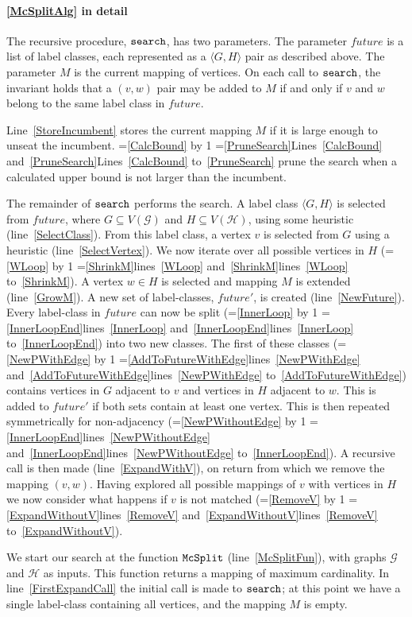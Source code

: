\documentclass[letterpaper]{article}
\newcommand{\AlgVar}[1]{\mathit{#1}}
\newcommand{\graphG}{\mathcal{G}}
\newcommand{\graphH}{\mathcal{H}}
\newcommand{\setG}{G}
\newcommand{\setH}{H}
\newcommand{\lineref}[1]{line~\ref{#1}}
\newcommand{\linerangeref}[2]{\count255=\ref{#1}\advance\count255 by 1 \ifnum\count255=\ref{#2}lines~\ref{#1} and~\ref{#2}\else lines~\ref{#1} to~\ref{#2}\fi}
\newcommand{\Lineref}[1]{Line~\ref{#1}}
\newcommand{\Linerangeref}[2]{\count255=\ref{#1}\advance\count255 by 1 \ifnum\count255=\ref{#2}Lines~\ref{#1} and~\ref{#2}\else Lines~\ref{#1} to~\ref{#2}\fi}
\begin{document}
\paragraph{\cref{McSplitAlg} in detail} The recursive procedure,
$\FuncSty{search}$, has two parameters.  The parameter $\AlgVar{future}$ is a
list of label classes, each represented as a $\langle \setG, \setH \rangle$ pair as
described above.  The parameter $M$ is the current mapping of vertices.  On
each call to $\FuncSty{search}$, the invariant holds that a $(v,w)$ pair may be
added to $M$ if and only if $v$ and $w$ belong to the same label class in
$\AlgVar{future}$.

\Lineref{StoreIncumbent} stores the current mapping $M$ if it is large enough
to unseat the incumbent.  \Linerangeref{CalcBound}{PruneSearch} prune the
search when a calculated upper bound is not larger than the incumbent.

The remainder of $\FuncSty{search}$ performs the search.  A label class
$\langle \setG, \setH \rangle$ is selected from $\AlgVar{future}$, where $\setG \subseteq
V(\graphG)$ and $\setH \subseteq V(\graphH)$, using some heuristic (\lineref{SelectClass}).
From this label class, a vertex $v$ is selected from $\setG$ using a heuristic
(\lineref{SelectVertex}). We now iterate over all possible vertices in $\setH$
(\linerangeref{WLoop}{ShrinkM}). A vertex $w \in \setH$ is selected and mapping $M$
is extended (\lineref{GrowM}). A new set of label-classes, $\AlgVar{future'}$,
is created (\lineref{NewFuture}).  Every label-class in $\AlgVar{future}$ can
now be split (\linerangeref{InnerLoop}{InnerLoopEnd}) into two new classes. The
first of these classes (\linerangeref{NewPWithEdge}{AddToFutureWithEdge})
contains vertices in $\setG$ adjacent to $v$ and vertices in $\setH$ adjacent to $w$.
This is added to $\AlgVar{future'}$ if both sets contain at least one vertex.
This is then repeated symmetrically for non-adjacency
(\linerangeref{NewPWithoutEdge}{InnerLoopEnd}). A recursive call is then made
(\lineref{ExpandWithV}), on return from which we remove the mapping $(v,w)$.
Having explored all possible mappings of $v$ with vertices in $\setH$ we now
consider what happens if $v$ is not matched
(\linerangeref{RemoveV}{ExpandWithoutV}).

We start our search at the function $\FuncSty{McSplit}$ (\lineref{McSplitFun}),
with graphs $\graphG$ and $\graphH$ as inputs.  This function returns a mapping of
maximum cardinality.  In \lineref{FirstExpandCall} the initial call is made to
$\FuncSty{search}$; at this point we have a single label-class containing all
vertices, and the mapping $M$ is empty.
\end{document}
